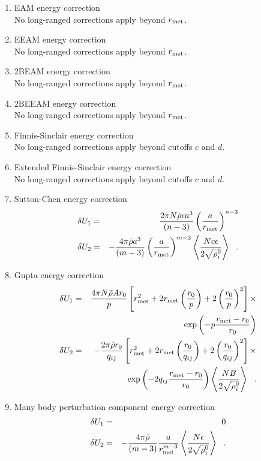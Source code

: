 \begin{enumerate}
\item EAM energy correction \\
No long-ranged corrections apply beyond $r_{\rm met}$.
\item EEAM energy correction \\
No long-ranged corrections apply beyond $r_{\rm met}$.
\item 2BEAM energy correction \\
No long-ranged corrections apply beyond $r_{\rm met}$.
\item 2BEEAM energy correction \\
No long-ranged corrections apply beyond $r_{\rm met}$.
\item Finnis-Sinclair energy correction \\
No long-ranged corrections apply beyond cutoffs $c$ and $d$.
\item Extended Finnis-Sinclair energy correction \\
No long-ranged corrections apply beyond cutoffs $c$ and $d$.
\item Sutton-Chen energy correction
\begin{eqnarray}
\delta U_{1} &=& \frac{2 \pi N \bar{\rho} \epsilon a^{3}}{(n-3)}
\left( \frac{a}{r_{\rm met}} \right)^{n-3} \nonumber \\
\delta U_{2} &=& -\frac{4 \pi \bar{\rho} a^{3}}{(m-3)} \left( \frac{a}{r_{\rm met}} \right)^{m-3}
\left< \frac{N c \epsilon}{2\sqrt{\rho_{i}^{0}}} \right>~~.
\end{eqnarray}
\item Gupta energy correction
\begin{eqnarray}
\delta U_{1} &=& \frac{4 \pi N \bar{\rho} A r_{0}}{p}
\left[ r_{\rm met}^{2} + 2 r_{\rm met} \left(\frac{r_{0}}{p}\right) +
2 \left(\frac{r_{0}}{p}\right)^{2} \right] \times \nonumber \\
& & \exp \left( -p \frac{r_{\rm met}-r_{0}}{r_{0}}\right) \nonumber \\
\delta U_{2} &=& -\frac{2 \pi \bar{\rho} r_{0}}{q_{ij}}
\left[ r_{\rm met}^{2} + 2 r_{\rm met} \left(\frac{r_{0}}{q_{ij}}\right) +
2 \left(\frac{r_{0}}{q_{ij}}\right)^{2} \right] \times \\
& & \exp \left( -2 q_{ij} \frac{r_{\rm met}-r_{0}}{r_{0}}\right)
\left< \frac{N B}{2\sqrt{\rho_{i}^{0}}} \right>~~. \nonumber
\end{eqnarray}
\item Many body perturbation component energy correction
\begin{eqnarray}
\delta U_{1} &=& 0 \nonumber \\
\delta U_{2} &=& -\frac{4 \pi \bar{\rho}}{(m-3)} \frac{a}{r_{\rm met}^{m-3}}
\left< \frac{N \epsilon}{2\sqrt{\rho_{i}^{0}}} \right>~~.
\end{eqnarray}
\end{enumerate}

